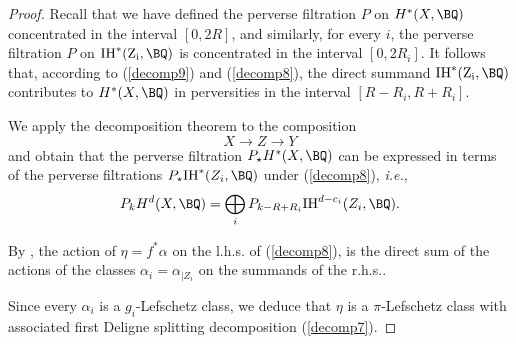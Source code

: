 \begin{proof}{Recall that we have defined the perverse filtration $P$ on $H^*(X,\BQ)$ concentrated in the interval $[0,{2R}]$,
and similarly,  for every $i$, the perverse filtration  $P$ on $\rm{IH}^*(Z_i,\BQ)$ is concentrated in the interval
$[0,{2R_i}]$. It follows that, according to  (\ref{decomp9}) and (\ref{decomp8}),  the direct summand $\rm{IH}^*(Z_i,\BQ)$ contributes to
$H^*(X,\BQ)$ in perversities in the interval ${[R-R_i,R+R_i]}$.

We apply the decomposition theorem to the composition
\[
X \to Z \to Y
\]
and obtain that the perverse filtration $P_\star H^*(X, \BQ)$ can be expressed in terms of the perverse filtrations $P_\star \mathrm{IH}^*(Z_i, \BQ)$ under (\ref{decomp8}), \emph{i.e.},
\[
P_kH^d(X, \BQ) = \bigoplus_i P_{k-{R} +{R_i}}\mathrm{IH}^{d-c_i}(Z_i, \BQ).
\]


By \cite[Remark 4.4.3]{dCM0}, the action of $\eta=f^*\alpha$ on the l.h.s. of (\ref{decomp8}), is
the direct sum of the actions of the classes $\alpha_i=\alpha_{|Z_i}$ on the summands of the r.h.s..


Since every $\alpha_i$ is a $g_i$-Lefschetz class,
we deduce that $\eta$ is a $\pi$-Lefschetz class with associated first Deligne splitting decomposition (\ref{decomp7}).}
\end{proof}



